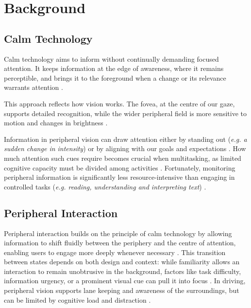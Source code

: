 \documentclass[
english,                 %
bibtex,                  %
includeExtraAbstracts, %
]{kththesis}
\numberwithin{listing}{chapter}
\begin{document}
\chapter{Background}
\label{ch:background}

\section{Calm Technology}
\label{sec:calm-technolog}

Calm technology aims to inform without continually demanding focused attention. It keeps information at the edge of awareness, where it remains perceptible, and brings it to the foreground when a change or its relevance warrants attention \cite{weiserDesigningCalmTechnology}.

This approach reflects how vision works. The fovea, at the centre of our gaze, supports detailed recognition, while the wider peripheral field is more sensitive to motion and changes in brightness \cite{strasburgerPeripheralVisionPattern2011,stewartReviewInteractionsPeripheral2020} \cite{zhaopingPeripheralVisionMainly2024}.

Information in peripheral vision can draw attention either by standing out (\textit{e.g. a sudden change in intensity}) or by aligning with our goals and expectations \cite{bakkerDesignPeripheralInteraction2013}. How much attention such cues require becomes crucial when multitasking, as limited cognitive capacity must be divided among activities \cite{wickensMultipleResourcesPerformance2002}. Fortunately, monitoring peripheral information is significantly less resource-intensive than engaging in controlled tasks (\textit{e.g. reading, understanding and interpreting text}) \cite{bakkerDesignPeripheralInteraction2013,heijboerFacilitatingPeripheralInteraction2016,bakkerPeripheralInteractionCharacteristics2015}.

\section{Peripheral Interaction}
\label{sec:peripheral-interaction}

Peripheral interaction builds on the principle of calm technology by allowing information to shift fluidly between the periphery and the centre of attention, enabling users to engage more deeply whenever necessary \cite{weiserComingAgeCalmTechnology1997,bakkerPeripheralInteractionShaping2014}. This transition between states depends on both design and context: while familiarity allows an interaction to remain unobtrusive in the background, factors like task difficulty, information urgency, or a prominent visual cue can pull it into focus \cite{bakkerInteractionAttentionContinuumConsidering,bakkerPeripheralInteractionCharacteristics2015}. In driving, peripheral vision supports lane keeping and awareness of the surroundings, but can be limited by cognitive load and distraction \cite{vaterPeripheralVisionRealworld2022}.
\end{document}
